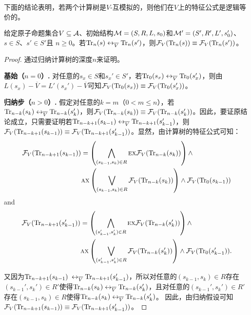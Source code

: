 下面的结论表明，若两个计算树是$V$-互模拟的，则他们在$V$上的特征公式是逻辑等价的。
\begin{lemma}\label{lem:Vb:TrFormula:Equ}
	给定原子命题集合$V\subseteq {\cal A}$、初始结构${\cal M}=(S,R,L,s_0)$和${\cal M}'=(S',R',L',s_0')$、$s\in S$、$s'\in S'$且 $n\ge 0$。若$\textrm{Tr}_n(s) \leftrightarrow_{\overline V} \textrm{Tr}_n(s')$，则${\cal F}_V(\textrm{Tr}_n(s)) \equiv {\cal F}_V(\textrm{Tr}_n(s'))$。
\end{lemma}
\begin{proof}
	通过归纳计算树的深度$n$来证明。
	
	\textbf{基始（$n=0$）.} 对任意的$s_x\in S$和$s_x' \in S'$，若$\textrm{Tr}_0(s_x) \leftrightarrow_{\overline V} \textrm{Tr}_0(s_x')$，则由$L(s_x) - \overline V = L'(s_x') - \overline V$可知${\cal F}_V(\textrm{Tr}_0(s_x)) \equiv {\cal F}_V(\textrm{Tr}_0(s_x'))$。
	
	\textbf{归纳步（$n>0$）.} 假定对任意的$k=m$（$0< m \leq n$），若$\textrm{Tr}_{n-k}(s_k) \leftrightarrow_{\overline V} \textrm{Tr}_{n-k}(s_k')$，则${\cal F}_V(\textrm{Tr}_{n-k}(s_k)) \equiv {\cal F}_V(\textrm{Tr}_{n-k}(s_k'))$。因此，要证原结论成立，只需要证明若$\textrm{Tr}_{n-k+1}(s_{k-1}) \leftrightarrow_{\overline V} \textrm{Tr}_{n-k+1}(s_{k-1}')$，则${\cal F}_V(\textrm{Tr}_{n-k+1}(s_{k-1})) \equiv {\cal F}_V(\textrm{Tr}_{n-k+1}(s_{k-1}'))$。显然，由计算树的特征公式可知：
	\begin{align*}
		{\cal F}_V(\textrm{Tr}_{n-k+1}(s_{k-1})) &  =
		\left(\bigwedge_{(s_{k-1},s_k)\in R}
		\textsc{e} \textsc{x} {\cal F}_V(\textrm{Tr}_{n-k}(s_k))\right)
		\wedge \\
		&\textsc{a} \textsc{x}\left(\bigvee_{(s_{k-1},s_k)\in R}
		{\cal F}_V(\textrm{Tr}_{n-k}(s_k) )\right)
		\wedge {\cal F}_V(\textrm{Tr}_0(s_{k-1}))
	\end{align*}
	and
	\begin{align*}
		{\cal F}_V(\textrm{Tr}_{n-k+1}(s_{k-1}')) &  =
		\left(\bigwedge_{(s_{k-1}',s_k')\in R}
		\textsc{e} \textsc{x} {\cal F}_V(\textrm{Tr}_{n-k}(s_k'))\right)
		\wedge \\
		&\textsc{a} \textsc{x}\left(\bigvee_{(s_{k-1}',s_k')\in R}
		{\cal F}_V(\textrm{Tr}_{n-k}(s_k') )\right)
		\wedge {\cal F}_V(\textrm{Tr}_0(s_{k-1}')).
	\end{align*} 

	又因为$\textrm{Tr}_{n-k+1}(s_{k-1})$ $\leftrightarrow_{\overline V} \textrm{Tr}_{n-k+1}(s_{k-1}')$，所以对任意的$(s_{k-1}, s_k) \in R$存在$(s_{k-1}', s_k') \in R'$使得$\textrm{Tr}_{n-k}(s_k) \leftrightarrow_{\overline V} \textrm{Tr}_{n-k}(s_k')$，且对任意的$(s_{k-1}', s_k') \in R'$存在$(s_{k-1}, s_k) \in R$使得$\textrm{Tr}_{n-k}(s_k) \leftrightarrow_{\overline V} \textrm{Tr}_{n-k}(s_k')$。
	因此，由归纳假设可知${\cal F}_V(\textrm{Tr}_{n-k+1}(s_{k-1})) \equiv {\cal F}_V(\textrm{Tr}_{n-k+1}(s_{k-1}'))$。
\end{proof}




